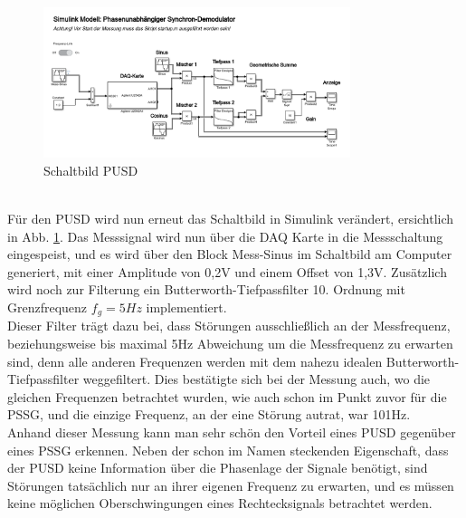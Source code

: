 \begin{figure}[h]
	\centering
	\includegraphics[width=0.8\textwidth]{./img/ch6/6_3_6}
	\caption{Schaltbild PUSD}
	\label{fg:schalt_pusd}
\end{figure}
~\\
Für den PUSD wird nun erneut das Schaltbild in Simulink verändert, ersichtlich in Abb. \ref{fg:schalt_pusd}. Das Messsignal wird nun über die DAQ Karte in die Messschaltung eingespeist, und es wird über den Block Mess-Sinus im Schaltbild am Computer generiert, mit einer Amplitude von 0,2V und einem Offset von 1,3V. Zusätzlich wird noch zur Filterung ein Butterworth-Tiefpassfilter 10. Ordnung mit Grenzfrequenz $f_g = 5Hz$ implementiert.
~\\
Dieser Filter trägt dazu bei, dass Störungen ausschließlich an der Messfrequenz, beziehungsweise bis maximal 5Hz Abweichung um die Messfrequenz zu erwarten sind, denn alle anderen Frequenzen werden mit dem nahezu idealen Butterworth-Tiefpassfilter weggefiltert. Dies bestätigte sich bei der Messung auch, wo die gleichen Frequenzen betrachtet wurden, wie auch schon im Punkt zuvor für die PSSG, und die einzige Frequenz, an der eine Störung autrat, war 101Hz.
~\\
Anhand dieser Messung kann man sehr schön den Vorteil eines PUSD gegenüber eines PSSG erkennen. Neben der schon im Namen steckenden Eigenschaft, dass der PUSD keine Information über die Phasenlage der Signale benötigt, sind Störungen tatsächlich nur an ihrer eigenen Frequenz zu erwarten, und es müssen keine möglichen Oberschwingungen eines Rechtecksignals betrachtet werden.















